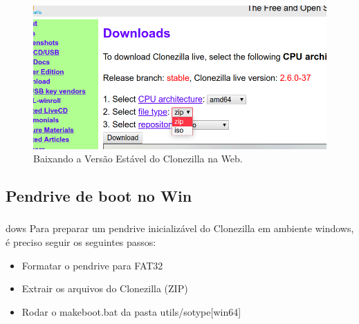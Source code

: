 \documentclass{beamer}
\begin{document}
\begin{frame}
    \frametitle{\insertsection}
    \framesubtitle{\insertsubsection}
    
    \begin{figure}
        \centering
        \includegraphics[scale=0.3]{images/baixando_clonezilla2.png}
        \caption{Baixando a Versão Estável do Clonezilla na Web.}
    \end{figure}
  
\end{frame}


\subsection{Pendrive de boot no Win}
\begin{frame}
 \frametitle{\insertsection}
    \framesubtitle{\insertsubsection}
     \begin{block}{\insertsubsection dows}
    \justifying Para preparar um pendrive inicializável do Clonezilla em ambiente windows, é preciso seguir os seguintes passos:
 
    \begin{itemize}[<+-| alert@+>]
        \item Formatar o pendrive para FAT32
        \item Extrair os arquivos do Clonezilla (ZIP)
        \item Rodar o makeboot.bat da pasta utils/sotype[win64]
    \end{itemize}
    \end{block}
\end{frame}
\end{document}
